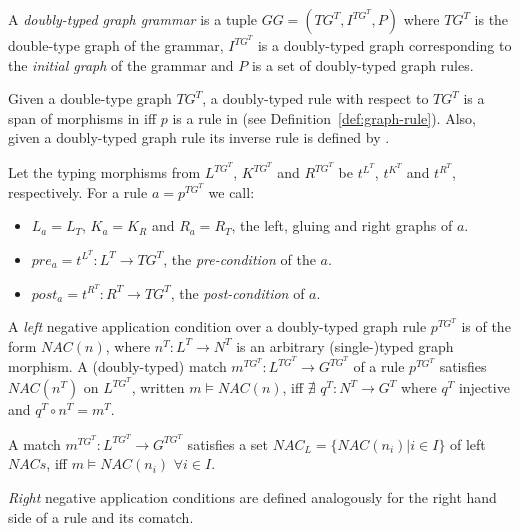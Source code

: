 \begin{definition} A \emph{doubly-typed graph grammar} is a tuple $GG = \left(TG^T, I^{TG^T},P \right)$ where $TG^T$ is the double-type graph of the grammar, $I^{TG^T}$ is a doubly-typed graph corresponding to the \emph{initial graph} of the grammar and $P$ is a set of doubly-typed graph rules. 
\end{definition}

\begin{definition} Given a double-type graph $TG^T$, a doubly-typed rule with respect to $TG^T$ is a span of morphisms \doublyTypedRule{} in \doublyTypedGraphCategory{} iff $p$ is a rule in \typedGraphCategory{} (see Definition~\ref{def:graph-rule}). Also, given a doubly-typed graph rule \doublyTypedRule{} its inverse rule is defined by \inverseDoublyTypedRule{}.

  Let the typing morphisms from $L^{TG^T}$, $K^{TG^T}$ and $R^{TG^T}$ be $t^{L^T}$, $t^{K^T}$ and $t^{R^T}$, respectively. For a rule $a = p^{TG^T}$ we call:

  \begin{itemize}
    \item $L_a = L_T$, $K_a = K_R$ and $R_a = R_T$, the left, gluing and right graphs of $a$.
    \item $pre_a = t^{L^T} : L^T \rightarrow TG^T$, the \emph{pre-condition} of the $a$.
    \item $post_a = t^{R^T} : R^T \rightarrow TG^T$, the \emph{post-condition} of $a$.
  \end{itemize}
\end{definition}

\begin{definition} A \emph{left} negative application condition over a doubly-typed graph rule $p^{TG^T}$ is of the form $NAC(n)$, where $n^T : L^T \rightarrow N^T$ is an arbitrary (single-)typed graph morphism. A  (doubly-typed) match $m^{TG^T} : L^{TG^T} \rightarrow G^{TG^T}$ of a rule $p^{TG^T}$ satisfies $NAC(n^T)$ on $L^{TG^T}$, written \mbox{$m \models NAC(n)$}, iff $\nexists$ $q^T : N^T \rightarrow G^T$ where $q^T$ injective and $q^T \circ n^T = m^T$.


  A match $m^{TG^T} : L^{TG^T} \rightarrow G^{TG^T}$ satisfies a set \mbox{$NAC_L = \{NAC\left(n_i\right)|i \in I\}$} of left $NACs$, iff \mbox{$m \models NAC\left(n_i\right)$} $\forall i \in I$.

\emph{Right} negative application conditions are defined analogously for the right hand side of a rule and its comatch.


\end{definition}

